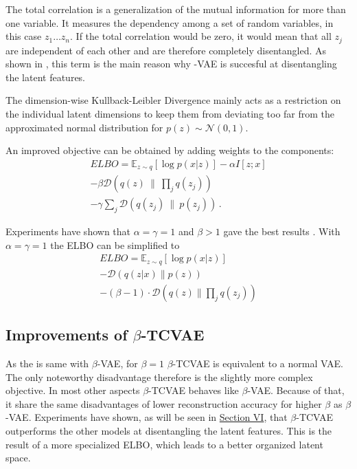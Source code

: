 \documentclass[a4paper]{IEEEtran}
\begin{document}
The total correlation is a generalization of the mutual information for more than one variable. It measures the dependency among a set of random variables, in this case $z_1 \ldots z_n$. If the total correlation would be zero, it would mean that all $z_j$ are independent of each other and are therefore completely disentangled. As shown in \cite{chen2019isolating}, this term is the main reason why \textbeta -VAE is succesful at disentangling the latent features.

The dimension-wise Kullback-Leibler Divergence mainly acts as a restriction on the individual latent dimensions to keep them from deviating too far from the approximated normal distribution for $p(z) \sim \mathcal{N}(0,1)$.

An improved objective can be obtained by adding weights to the components:
\begin{align*}
	ELBO = \mathbb{E}_{z \sim q}\left[ \log p(x|z) \right] - \alpha I[z;x] \\ - \beta \mathcal{D}(q(z) \ \| \  \prod_{j} q(z_j)) \\ - \gamma \sum_j \mathcal{D}(q(z_j) \ \| \ p(z_j))\,.
\end{align*}

Experiments have shown that $\alpha = \gamma = 1$ and $\beta > 1$ gave the best results \cite{chen2019isolating}. With $\alpha = \gamma = 1$ the ELBO can be simplified to
\begin{align*}
	ELBO = \mathbb{E}_{z \sim q}\left[ \log p(x|z) \right]\\
	 - \mathcal{D}(q(z|x) \| p(z))\\
	 - (\beta - 1) \cdot \mathcal{D}(q(z) \| \prod_j q(z_j))
\end{align*}

\subsection{Improvements of $\beta$-TCVAE}
As the is same with $\beta$-VAE, for $\beta = 1$ $\beta$-TCVAE is equivalent to a normal VAE. The only noteworthy disadvantage therefore is the slightly more complex objective. In most other aspects $\beta$-TCVAE behaves like $\beta$-VAE. Because of that, it share the same disadvantages of lower reconstruction accuracy for higher $\beta$ as $\beta$-VAE. Experiments have shown, as will be seen in \hyperref[sec:experiments]{Section VI}, that $\beta$-TCVAE outperforms the other models at disentangling the latent features. This is the result of a more specialized ELBO, which leads to a better organized latent space. 
\end{document}
